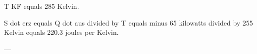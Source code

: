 T KF equals 285 Kelvin.  

S dot erz equals Q dot aus divided by T equals minus 65 kilowatts divided by 255 Kelvin equals 220.3 joules per Kelvin.  

---